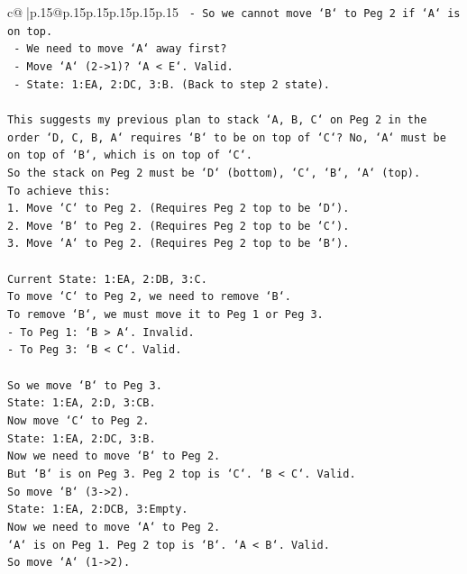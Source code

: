 \documentclass{article}
\begin{document}
{\begin{supertabular}{c@{$\;$}|p{.15\linewidth}@{}p{.15\linewidth}p{.15\linewidth}p{.15\linewidth}p{.15\linewidth}p{.15\linewidth}}
{{{\texttt{   {-} So we cannot move `B` to Peg 2 if `A` is on top.} \\
\texttt{   {-} We need to move `A` away first?} \\
\texttt{   {-} Move `A` (2{-}>1)? `A < E`. Valid.} \\
\texttt{   {-} State: 1:EA, 2:DC, 3:B. (Back to step 2 state).} \\
\\ 
\texttt{This suggests my previous plan to stack `A, B, C` on Peg 2 in the order `D, C, B, A` requires `B` to be on top of `C`? No, `A` must be on top of `B`, which is on top of `C`.} \\
\texttt{So the stack on Peg 2 must be `D` (bottom), `C`, `B`, `A` (top).} \\
\texttt{To achieve this:} \\
\texttt{1. Move `C` to Peg 2. (Requires Peg 2 top to be `D`).} \\
\texttt{2. Move `B` to Peg 2. (Requires Peg 2 top to be `C`).} \\
\texttt{3. Move `A` to Peg 2. (Requires Peg 2 top to be `B`).} \\
\\ 
\texttt{Current State: 1:EA, 2:DB, 3:C.} \\
\texttt{To move `C` to Peg 2, we need to remove `B`.} \\
\texttt{To remove `B`, we must move it to Peg 1 or Peg 3.} \\
\texttt{{-} To Peg 1: `B > A`. Invalid.} \\
\texttt{{-} To Peg 3: `B < C`. Valid.} \\
\\ 
\texttt{So we move `B` to Peg 3.} \\
\texttt{State: 1:EA, 2:D, 3:CB.} \\
\texttt{Now move `C` to Peg 2.} \\
\texttt{State: 1:EA, 2:DC, 3:B.} \\
\texttt{Now we need to move `B` to Peg 2.} \\
\texttt{But `B` is on Peg 3. Peg 2 top is `C`. `B < C`. Valid.} \\
\texttt{So move `B` (3{-}>2).} \\
\texttt{State: 1:EA, 2:DCB, 3:Empty.} \\
\texttt{Now we need to move `A` to Peg 2.} \\
\texttt{`A` is on Peg 1. Peg 2 top is `B`. `A < B`. Valid.} \\
\texttt{So move `A` (1{-}>2).} \\
}}}
\end{supertabular}}
\end{document}
